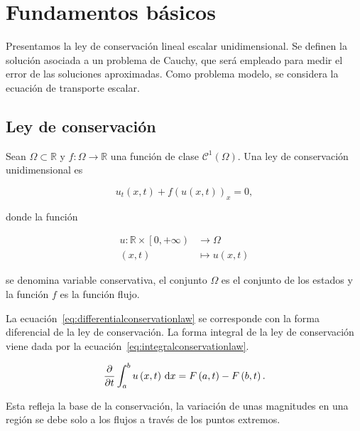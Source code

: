 \chapter{Fundamentos básicos}\label{ch:fundaments}

Presentamos la ley de conservación lineal escalar unidimensional.
Se definen la solución asociada a un problema de Cauchy, que será
empleado para medir el error de las soluciones aproximadas.
Como problema modelo, se considera la ecuación de transporte escalar.

\section{Ley de conservación}

\begin{definition}
  Sean
  \begin{math}
    \Omega\subset
    \mathbb{R}
  \end{math}
  y
  \begin{math}
    f\colon\Omega\to
    \mathbb{R}
  \end{math}
  una
  función de clase
  \begin{math}
    \mathcal{C}^{1}
    \left(\Omega\right)
  \end{math}.
  Una ley de conservación unidimensional es

  \begin{equation}\label{eq:differentialconservationlaw}
    u_{t}
    \left(x,t\right)+
    {f\left(u\left(x,t\right)\right)}_{x}=
    0,
  \end{equation}

  donde la función

  \begin{align*}
    u\colon\mathbb{R}\times
    \left[0,+\infty\right) &
    \longrightarrow
    \Omega                   \\
    \left(x,t\right)       &
    \longmapsto
    u\left(x,t\right)
  \end{align*}

  se denomina variable conservativa, el conjunto $\Omega$ es el
  conjunto de los estados y la función $f$ es la función flujo.
\end{definition}

\begin{remark}
  La ecuación~\eqref{eq:differentialconservationlaw} se corresponde
  con la forma diferencial de la ley de conservación.
  La forma integral de la ley de conservación viene dada por la
  ecuación~\eqref{eq:integralconservationlaw}.

  \begin{equation}\label{eq:integralconservationlaw}
    \diffp{}{t}
    \int_{a}^{b}
    u\left(x,t\right)\dl x=
    F\left(a,t\right)-
    F\left(b,t\right).
  \end{equation}

  Esta refleja la base de la conservación, la variación de unas
  magnitudes en una región se debe solo a los flujos a través de los
  puntos extremos.
\end{remark}

